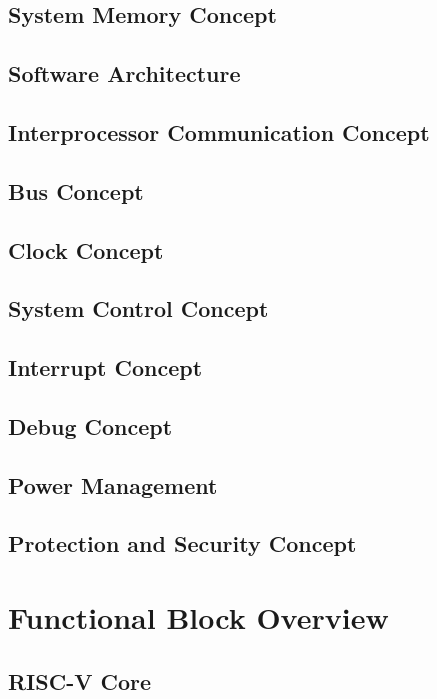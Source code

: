 \subsection{System Memory Concept}

\subsection{Software Architecture}

\subsection{Interprocessor Communication Concept}

\subsection{Bus Concept}

\subsection{Clock Concept}

\subsection{System Control Concept}

\subsection{Interrupt Concept}
\label{subsec:irqconcept}

\subsection{Debug Concept}

\subsection{Power Management}

\subsection{Protection and Security Concept}

\section{Functional Block Overview}

\subsection{RISC-V Core}

